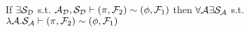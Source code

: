 \begin{theorem}\label{thm:dummy}
If $\exists \mathcal{S}_{\mathcal{D}}$ s.t. $ \mathcal{A}_\mathcal{D}, \mathcal{S}_{\mathcal{D}} \vdash (\pi, \mathcal{F}_2) \sim (\phi, \mathcal{F}_1)$ then $\forall \mathcal{A} \exists \mathcal{S}_\mathcal{A}$ s.t. $\lambda \mathcal{A} . \mathcal{S}_\mathcal{A}\vdash  (\pi, \mathcal{F}_2) \sim (\phi, \mathcal{F}_1)$ 



\end{theorem}

